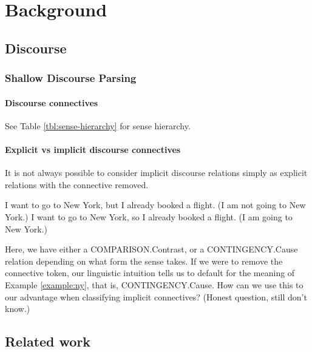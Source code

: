 
\chapter{Background}

\section{Discourse}


\subsection{Shallow Discourse Parsing}



\subsubsection{Discourse connectives}

See Table \ref{tbl:sense-hierarchy} for sense hierarchy.

\subsubsection{Explicit vs implicit discourse connectives} \label{sec:implexpl}



It is not always possible to consider implicit discourse relations simply as explicit relations with the connective removed.

\begin{exe}
\ex I want to go to New York, but I already booked a flight. (I am not going to New York.)\label{example:notny}
\ex I want to go to New York, so I already booked a flight. (I am going to New York.)\label{example:ny}
\end{exe}

Here, we have either a COMPARISON.Contrast, or a CONTINGENCY.Cause relation depending on what form the sense takes. If we were to remove the connective token, our linguistic intuition tells us to default for the meaning of Example \ref{example:ny}, that is, CONTINGENCY.Cause. How can we use this to our advantage when classifying implicit connectives? (Honest question, still don't know.)

\section{Related work}

